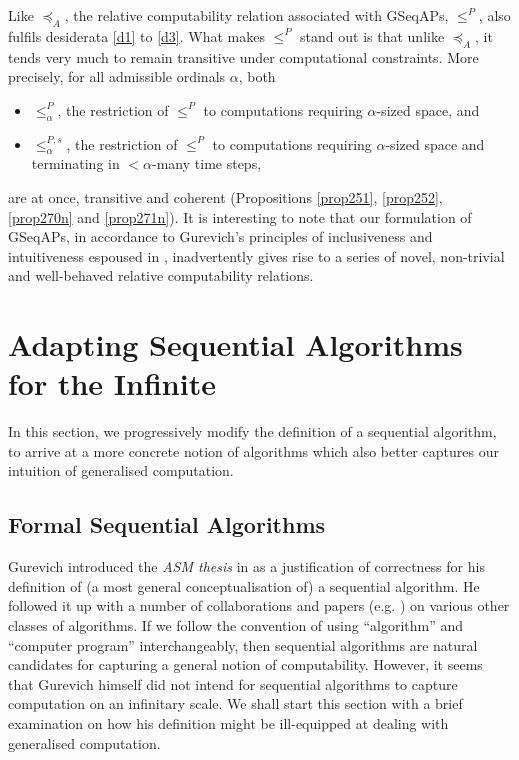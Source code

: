 \documentclass[12pt, twoside]{memoir}
\numberwithin{equation}{section}
\theoremstyle{definition}
\theoremstyle{remark}
\theoremstyle{definition}
\theoremstyle{definition}
\theoremstyle{definition}
\theoremstyle{remark}
\begin{document}
Like $\preceq_A$, the relative computability relation associated with GSeqAPs, $\leq^P$, also fulfils desiderata \ref{d1} to \ref{d3}. What makes $\leq^P$ stand out is that unlike $\preceq_A$, it tends very much to remain transitive under computational constraints. More precisely, for all admissible ordinals $\alpha$, both
\begin{itemize}
    \item $\leq^P_{\alpha}$, the restriction of $\leq^P$ to computations requiring $\alpha$-sized space, and
    \item $\leq^{P, s}_{\alpha}$, the restriction of $\leq^P$ to computations requiring $\alpha$-sized space and terminating in $< \alpha$-many time steps,
\end{itemize}
are at once, transitive and coherent (Propositions \ref{prop251}, \ref{prop252}, \ref{prop270n} and \ref{prop271n}). It is interesting to note that our formulation of GSeqAPs, in accordance to Gurevich's principles of inclusiveness and intuitiveness espoused in \cite{gurevich}, inadvertently gives rise to a series of novel, non-trivial and well-behaved relative computability relations. 

\section{Adapting Sequential Algorithms for the Infinite}\label{sect82}

In this section, we progressively modify the definition of a sequential algorithm, to arrive at a more concrete notion of algorithms which also better captures our intuition of generalised computation. 

\subsection{Formal Sequential Algorithms}\label{ss210}

Gurevich introduced the \textit{ASM thesis} in \cite{gurevich} as a justification of correctness for his definition of (a most general conceptualisation of) a sequential algorithm. He followed it up with a number of collaborations and papers (e.g. \cite{gurevichblass}) on various other classes of algorithms. If we follow the convention of using ``algorithm'' and ``computer program'' interchangeably, then sequential algorithms are natural candidates for capturing a general notion of computability. However, it seems that Gurevich himself did not intend for sequential algorithms to capture computation on an infinitary scale. We shall start this section with a brief examination on how his definition might be ill-equipped at dealing with generalised computation. 
\end{document}
